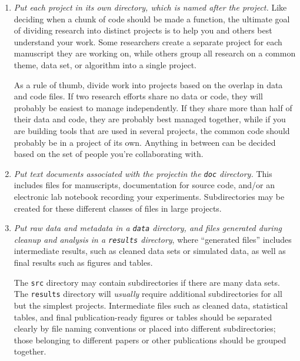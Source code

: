 \documentclass[10pt]{article}
\newcommand{\recommend}[1]{\textit{#1}}
\begin{document}
\begin{enumerate}

\item
  \recommend{Put each project in its own directory, which is named
    after the project.}  Like deciding when a chunk of code should be
  made a function, the ultimate goal of dividing research into
  distinct projects is to help you and others best understand your
  work. Some researchers create a separate project for each manuscript
  they are working on, while others group all research on a common
  theme, data set, or algorithm into a single project.
    
  As a rule of thumb, divide work into projects based on the overlap
  in data and code files. If two research efforts share no data or
  code, they will probably be easiest to manage independently. If they
  share more than half of their data and code, they are probably best
  managed together, while if you are building tools that are used in
  several projects, the common code should probably be in a project of
  its own. Anything in between can be decided based on the set of
  people you're collaborating with.

\item
  \recommend{Put text documents associated with the projectin the
    \texttt{doc} directory.} This includes files for manuscripts,
  documentation for source code, and/or an electronic lab notebook
  recording your experiments.  Subdirectories may be created for these
  different classes of files in large projects.

\item
  \recommend{Put raw data and metadata in a \texttt{data} directory,
    and files generated during cleanup and analysis in a
    \texttt{results} directory}, where ``generated files'' includes
  intermediate results, such as cleaned data sets or simulated data,
  as well as final results such as figures and tables.

  The \texttt{src} directory may contain subdirectories if there are
  many data sets.  The \texttt{results} directory will \emph{usually}
  require additional subdirectories for all but the simplest
  projects. Intermediate files such as cleaned data, statistical
  tables, and final publication-ready figures or tables should be
  separated clearly by file naming conventions or placed into
  different subdirectories; those belonging to different papers or
  other publications should be grouped together.


\end{enumerate}
\end{document}
